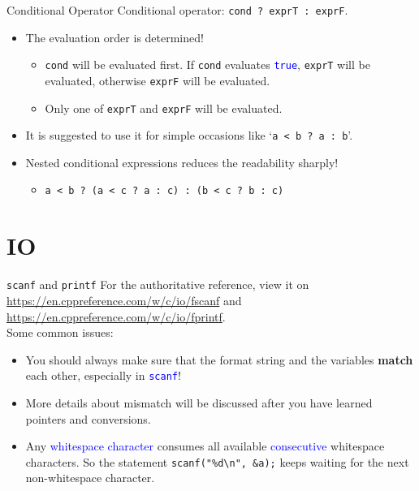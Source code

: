 \documentclass[handout]{beamer}
\newcommand{\blue}[1]{\textcolor{blue}{#1}}
\newcommand{\ttt}[1]{\texttt{#1}}
\newcommand{\bluett}[1]{\blue{\ttt{#1}}}
\begin{document}
\begin{frame}{Conditional Operator}
    Conditional operator: \ttt{cond ? exprT : exprF}.
    \begin{itemize}
        \item The evaluation order is determined!
        \pause
        \begin{itemize}
            \item \ttt{cond} will be evaluated first. If \ttt{cond} evaluates \bluett{true}, \ttt{exprT} will be evaluated, otherwise \ttt{exprF} will be evaluated.
            \item Only one of \ttt{exprT} and \ttt{exprF} will be evaluated.
        \end{itemize}
        \pause
        \item It is suggested to use it for simple occasions like `\ttt{a < b ? a : b}'.
        \item Nested conditional expressions reduces the readability sharply!
        \begin{itemize}
            \item \ttt{a < b ? (a < c ? a : c) : (b < c ? b : c)}
        \end{itemize}
    \end{itemize}
\end{frame}

\section{IO}

\begin{frame}{\ttt{scanf} and \ttt{printf}}
    For the authoritative reference, view it on \url{https://en.cppreference.com/w/c/io/fscanf} and \url{https://en.cppreference.com/w/c/io/fprintf}.\\
    \pause
    Some common issues:
    \begin{itemize}
        \item You should always make sure that the format string and the variables \textbf{match} each other, especially in \bluett{scanf}!
        \item More details about mismatch will be discussed after you have learned pointers and conversions.
        \pause
        \item Any \blue{whitespace character} consumes all available \blue{consecutive} whitespace characters. So the statement \ttt{scanf("\%d\textbackslash n", \&a);} keeps waiting for the next non-whitespace character.
    \end{itemize}
\end{frame}
\end{document}
